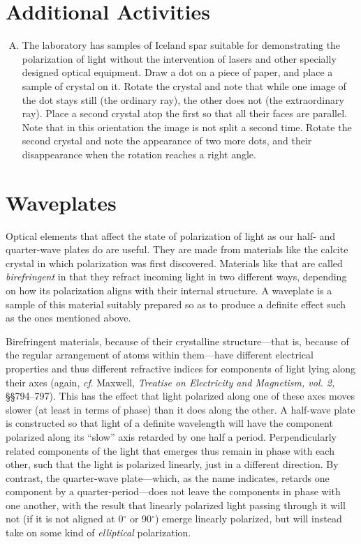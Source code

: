 \section*{Additional Activities}

\begin{enumerate}[(J)]

\item The laboratory has samples of Iceland spar suitable for demonstrating the polarization of light without the intervention of lasers and other specially designed optical equipment. Draw a dot on a piece of paper, and place a sample of crystal on it. Rotate the crystal and note that while one image of the dot stays still (the ordinary ray), the other does not (the extraordinary ray). Place a second crystal atop the first so that all their faces are parallel. Note that in this orientation the image is not split a second time. Rotate the second crystal and note the appearance of two more dots, and their disappearance when the rotation reaches a right angle.


\end{enumerate}


\section*{Waveplates}

Optical elements that affect the state of polarization of light as our half- and quarter-wave plates do are useful. They are made from materials like the calcite crystal in which polarization was first discovered. Materials like that are called \emph{birefringent} in that they refract incoming light in two different ways, depending on how its polarization aligns with their internal structure. A waveplate is a sample of this material suitably prepared so as to produce a definite effect such as the ones mentioned above.

Birefringent materials, because of their crystalline structure---that is, because of the regular arrangement of atoms within them---have different electrical properties and thus different refractive indices for components of light lying along their axes (again, \emph{cf}. Maxwell, \emph{Treatise on Electricity and Magnetism, vol. 2,} \S\S 794--797). This has the effect that light polarized along one of these axes moves slower (at least in terms of phase) than it does along the other. A half-wave plate is constructed so that light of a definite wavelength will have the component polarized along its ``slow'' axis retarded by one half a period. Perpendicularly related components of the light that emerges thus remain in phase with each other, such that the light is polarized linearly, just in a different direction. By contrast, the quarter-wave plate---which, as the name indicates, retards one component by a quarter-period---does not leave the components in phase with one another, with the result that linearly polarized light passing through it will not (if it is not aligned at 0$^\circ$ or 90$^\circ$) emerge linearly polarized, but will instead take on some kind of \emph{elliptical} polarization.

